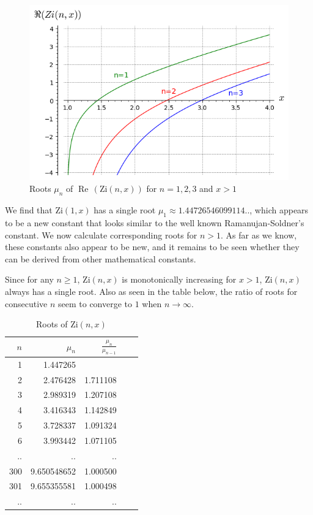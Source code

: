 \documentclass[a4paper,11pt,twoside]{amsart}
\newcommand\Zi{\mathrm{Zi}}
\renewcommand\Re{{\operatorname{Re\,}}}
\begin{document}
\begin{figure}[H]
  \includegraphics[width=0.8\linewidth]{RootsZinx.png}
  \caption{Roots $\mu_n$ of $\Re(\Zi(n,x))$ for $n=1,2,3$ and $x > 1$}
\end{figure}

We find that $\Zi(1,x)$ has a single root $\mu_1 \approx 1.44726546099114$.., which appears to be a new constant that looks similar to the well known Ramanujan-Soldner's constant. We now calculate corresponding roots for $n>1$. As far as we know, these constants also appear to be new, and it remains to be seen whether they can be derived from other mathematical constants. 

Since for any $n \ge 1$, $\Zi(n,x)$ is monotonically increasing for $x>1$, $\Zi(n,x)$ always has a single root. Also as seen in the table below, the ratio of roots for consecutive $n$ seem to converge to $1$ when $n \rightarrow \infty$. 

\begin{table}[H]
  \begin{center}
    \caption{Roots of $\Zi(n,x)$}
    \label{tab:table2}
    \begin{tabular}{r|r|r|r|r} %
      $n$ & $\mu_{n}$ & $\frac{\mu_{n}}{\mu_{n-1}}$\\
      \hline
      1 & 1.447265 & \\
      2 & 2.476428 & 1.711108\\
      3 & 2.989319 & 1.207108\\
      4 & 3.416343 & 1.142849\\
      5 & 3.728337 & 1.091324\\
      6 & 3.993442 & 1.071105\\
      .. & .. & ..\\
      300 & 9.650548652 & 1.000500\\
      301 & 9.655355581 & 1.000498\\
      .. & .. & ..\\
    \end{tabular}
  \end{center}
\end{table}
\end{document}
